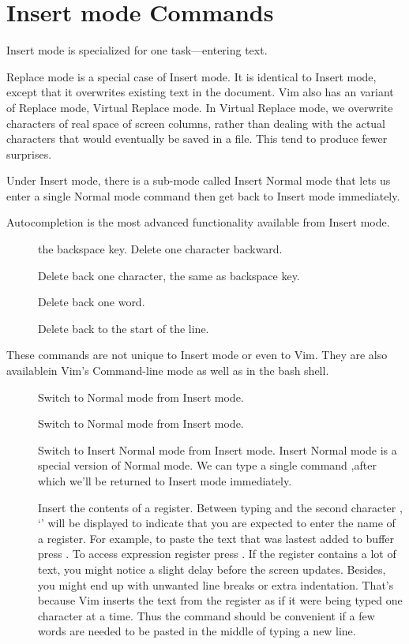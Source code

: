 \documentclass{article}
\newcommand{\syntax}[1]{\PVerb{#1}}
\newcommand{\sq}[1]{`#1'}
\begin{document}
\section{Insert mode Commands}
Insert mode is specialized for one task---entering text.

Replace mode is a special case of Insert mode. It is identical to Insert mode, except that it overwrites existing text in  the document. Vim also has an variant of Replace mode, Virtual Replace mode. In Virtual Replace mode, we overwrite characters of real space of screen columns, rather than dealing with the actual characters that would eventually be saved in a file. This tend to produce fewer surprises.

Under Insert mode, there is a sub-mode called Insert Normal mode that lets us enter a single Normal mode command then get back to Insert mode immediately.

Autocompletion is the most advanced functionality available from Insert mode.

\begin{description}
  \item[\syntax{<BS>}] the backspace key. Delete one character backward.
  \item[\syntax{<C-h>}] Delete back one character, the same as backspace key.
  \item[\syntax{<C-w>}] Delete back one word.
  \item[\syntax{<C-u>}] Delete back to the start of the line.
\end{description}
These commands are not unique to Insert mode or even to Vim. They are also availablein Vim's Command-line mode as well as in the bash shell.

\begin{description}
  \item[\syntax{<Esc>}] Switch to Normal mode from Insert mode.
  \item[\syntax{<C-[>}] Switch to Normal mode from Insert mode.\vphantom{]}
  \item[\syntax{<C-o>}] Switch to Insert Normal mode from Insert mode.
Insert Normal mode is a special version of Normal mode. We can type a single command ,after which we'll be returned to Insert mode immediately.
\item[\syntax{<C-r>}] Insert the contents of a register.  Between typing \syntax{<CTRL-r>} and the second character \syntax{{register}}, \sq{\syntax{"}} will be displayed to indicate that you are expected to enter the name of a register. For example, to paste the text that was lastest added to buffer press \syntax{<C-r>0}. To access expression register press \syntax{<C-r>=}. If the register contains a lot of text, you might notice a slight delay before the screen updates. Besides, you might end up with unwanted line breaks or extra indentation. That's because Vim inserts the text from the register as if it were being typed one character at a time. Thus the command should be convenient if a few words are needed to be pasted in the middle of typing a new line.
  
\end{description}
\end{document}
